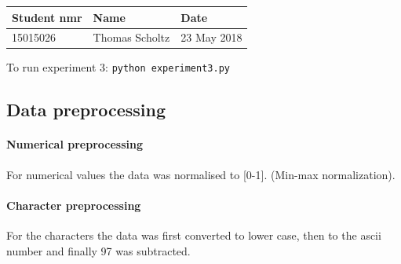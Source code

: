 \documentclass[11pt]{article}
\begin{document}
\begin{longtable}[]{@{}lll@{}}
\toprule
Student nmr & Name & Date\tabularnewline
\midrule
\endhead
15015026 & Thomas Scholtz & 23 May 2018\tabularnewline
\bottomrule
\end{longtable}

To run experiment 3: \texttt{python\ experiment3.py}

    \hypertarget{data-preprocessing}{%
\subsection{Data preprocessing}\label{data-preprocessing}}

\hypertarget{numerical-preprocessing}{%
\paragraph{Numerical preprocessing}\label{numerical-preprocessing}}

For numerical values the data was normalised to {[}0-1{]}. (Min-max
normalization).

\hypertarget{character-preprocessing}{%
\paragraph{Character preprocessing}\label{character-preprocessing}}

For the characters the data was first converted to lower case, then to
the ascii number and finally 97 was subtracted.
\end{document}
